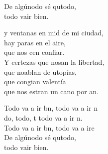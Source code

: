 \begin{cancion}
\begin{chorus}
		De algúnodo sé qutodo,\\
		todo vair bien.\jump\\
	\end{chorus}%
	y ventanas en mid de mi ciudad,\\
	hay paras en el aire,\\
	que nos cen confiar.\\
	Y certezas que nosan la libertad,\\
	que noablan de utopías,\\
	que congian valentía\\
	que nos estran un cano por an.\jump\\
	\begin{chorus}%
		Todo va a ir bn, todo va a ir n\\
		do, todo, t todo va a ir n.\\
		Todo va a ir bn, todo va a ire\\
		De algúnodo sé qutodo,\\
		todo vair bien.\jump\\
	\end{chorus}%
\end{cancion}%
